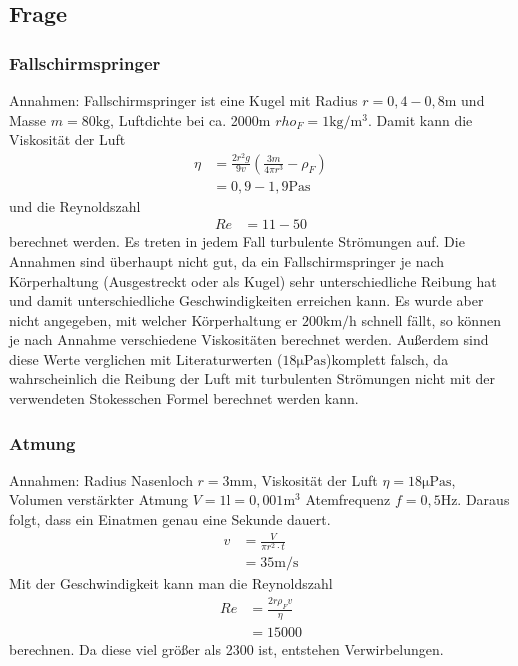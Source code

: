 \documentclass[11pt, a4paper]{article}
\begin{document}
    \subsection{Frage}
    \subsubsection{Fallschirmspringer}
    Annahmen: Fallschirmspringer ist eine Kugel mit Radius $r = 0,4 - 0,8 \si{\metre}$ und Masse $m = 80 \si{\kilogram}$, Luftdichte bei ca. 2000m $rho_F = 1 \si{\kilogram\per\cubic\metre}$.
    Damit kann die Viskosität der Luft
    \begin{align}
        \eta &= \frac{2 r^2 g}{9 v}(\frac{3m}{4 \pi r^3} - \rho_F) \nonumber \\
        &= 0,9 - 1,9 \si{\pascal\second}
    \end{align}
    und die Reynoldszahl
    \begin{align}
        Re &= 11 - 50
    \end{align}
    berechnet werden. Es treten in jedem Fall turbulente Strömungen auf. Die Annahmen sind überhaupt nicht gut, da ein Fallschirmspringer je nach Körperhaltung (Ausgestreckt oder als Kugel)
    sehr unterschiedliche Reibung hat und damit unterschiedliche Geschwindigkeiten erreichen kann. Es wurde aber nicht angegeben, mit welcher Körperhaltung
    er $200 \si{\kilo\metre\per\hour}$  schnell fällt, so können je nach Annahme verschiedene Viskositäten berechnet werden.
    Außerdem sind diese Werte verglichen mit Literaturwerten ($18 \si{\micro\pascal\second}$)komplett falsch, da wahrscheinlich die Reibung der Luft mit turbulenten Strömungen
    nicht mit der verwendeten Stokesschen Formel \cite[(9)]{VIS} berechnet werden kann.

    \subsubsection{Atmung}
    Annahmen: Radius Nasenloch $r = 3 \si{\milli\metre}$,  Viskosität der Luft $\eta = 18 \si{\micro\pascal\second}$, Volumen verstärkter Atmung $V = 1 \si{\litre} = 0,001 \si{\metre\cubed}$
    Atemfrequenz $f = 0,5 \si{\hertz}$. Daraus folgt, dass ein Einatmen genau eine Sekunde dauert.
    \begin{align}
        v &= \frac{V}{\pi r ^2 \cdot t} \nonumber \\
            &= 35 \si{\metre\per\second}
    \end{align}
    Mit der Geschwindigkeit kann man die Reynoldszahl
    \begin{align}
        Re &= \frac{2r \rho_F v}{\eta} \nonumber \\
        &= 15000
    \end{align}
    berechnen. Da diese viel größer als 2300 ist, entstehen Verwirbelungen.

    
    
\end{document}
